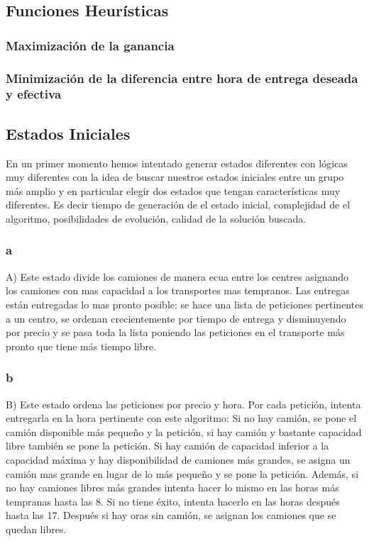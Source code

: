 \documentclass{article}
\begin{document}
\subsection{Funciones Heurísticas}
\subsubsection{Maximización de la ganancia}
\subsubsection{Minimización de la diferencia entre hora de entrega deseada y
efectiva}


\subsection{Estados Iniciales}

En un primer momento hemos intentado generar estados diferentes con lógicas muy diferentes con la idea de buscar nuestros estados iniciales entre un grupo más amplio y en particular elegir dos estados que tengan características muy diferentes. Es decir tiempo de generación de el estado inicial, complejidad de el algoritmo, posibilidades de evolución, calidad de la solución buscada.

\subsubsection{a}
A) Este estado divide los camiones de manera ecua entre los centres asignando los camiones con mas capacidad a los transportes mas tempranos. Las entregas están entregadas lo mas pronto posible: se hace una lista de peticiones pertinentes a un centro, se ordenan crecientemente por tiempo de entrega y disminuyendo por precio y se pasa toda la lista poniendo las peticiones en el transporte más pronto que tiene más tiempo libre.

\subsubsection{b}
B) Este estado ordena las peticiones por precio y hora. Por cada petición, intenta entregarla en la hora pertinente con este algoritmo:
Si no hay camión, se pone el camión disponible más pequeño y la petición, si hay camión y bastante capacidad libre también se pone la petición. Si hay camión de capacidad inferior a la capacidad máxima y hay disponibilidad de camiones más grandes, se asigna un camión mas grande en lugar de lo más pequeño y se pone la petición. Además, si no hay camiones libres más grandes intenta hacer lo mismo en las horas más tempranas hasta las 8. Si no tiene éxito, intenta hacerlo en las horas después hasta las 17.
Después si hay oras sin camión, se asignan los camiones que se quedan libres.
\end{document}
